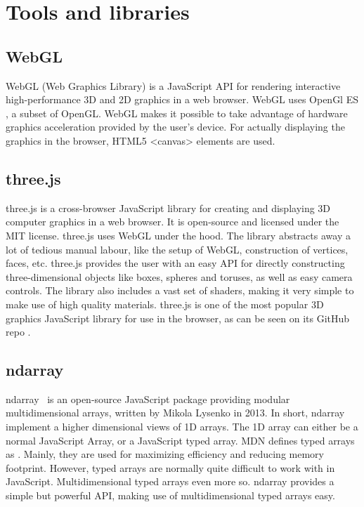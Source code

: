 \section{Tools and libraries}
\subsection{WebGL}
WebGL (Web Graphics Library) \cite{webgl} is a JavaScript API for rendering interactive high-performance 3D and 2D graphics in a web browser. WebGL uses OpenGl ES \cite{opengl-es}, a subset of OpenGL. WebGL makes it possible to take advantage of hardware graphics acceleration provided by the user's device. For actually displaying the graphics in the browser, HTML5 <canvas> elements are used. 

\subsection{three.js}
three.js\cite{three.js} is a cross-browser JavaScript library for creating and displaying 3D computer graphics in a web browser. It is open-source and licensed under the MIT license. three.js uses WebGL under the hood. The library abstracts away a lot of tedious manual labour, like the setup of WebGL, construction of vertices, faces, etc. three.js provides the user with an easy API for directly constructing three-dimensional objects like boxes, spheres and toruses, as well as easy camera controls. The library also includes a vast set of shaders, making it very simple to make use of high quality materials. three.js is one of the most popular 3D graphics JavaScript library for use in the browser, as can be seen on its GitHub repo \cite{three.js}.

\subsection{ndarray}
\label{sec:theory-ndarray}
ndarray~\cite{ndarray} is an open-source JavaScript package providing modular multidimensional arrays, written by Mikola Lysenko in 2013. In short, ndarray implement a higher dimensional views of 1D arrays. The 1D array can either be a normal JavaScript Array, or a JavaScript typed array. MDN defines typed arrays as . Mainly, they are used for maximizing efficiency and reducing memory footprint. However, typed arrays are normally quite difficult to work with in JavaScript. Multidimensional typed arrays even more so. ndarray provides a simple but powerful API, making use of multidimensional typed arrays easy.


